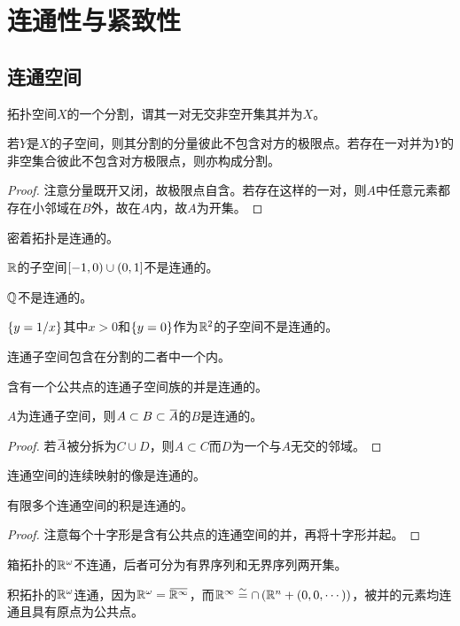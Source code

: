 \documentclass{ctexrep}
\begin{document}
  \section{连通性与紧致性}
  \subsection{连通空间}
  \begin{definition}
    拓扑空间$X$的一个分割，谓其一对无交非空开集其并为$X$。
  \end{definition}
  \begin{lemma}
    若$Y$是$X$的子空间，则其分割的分量彼此不包含对方的极限点。若存在一对并为$Y$的非空集合彼此不包含对方极限点，则亦构成分割。
  \end{lemma}
  \begin{proof}
    注意分量既开又闭，故极限点自含。若存在这样的一对，则$A$中任意元素都存在小邻域在$B$外，故在$A$内，故$A$为开集。
  \end{proof}
  \begin{ex}
    密着拓扑是连通的。
  \end{ex}
  \begin{ex}
    $\mathbb{R}$的子空间$\left[-1,0\right)\cup\left(0,1\right]$不是连通的。
  \end{ex}
  \begin{ex}
    $\mathbb{Q}$不是连通的。
  \end{ex}
  \begin{ex}
    $\left\{y=1/x\right\}$其中$x>0$和$\left\{y=0\right\}$作为$\mathbb{R}^2$的子空间不是连通的。
  \end{ex}
  \begin{lemma}
    连通子空间包含在分割的二者中一个内。
  \end{lemma}
  \begin{theorem}
    含有一个公共点的连通子空间族的并是连通的。
  \end{theorem}
  \begin{theorem}
    $A$为连通子空间，则$A\subset B \subset \clo{A}$的$B$是连通的。
  \end{theorem}
  \begin{proof}
    若$\clo{A}$被分拆为$C\cup D$，则$A\subset C$而$D$为一个与$A$无交的邻域。
  \end{proof}
  \begin{theorem}
    连通空间的连续映射的像是连通的。
  \end{theorem}
  \begin{theorem}
    有限多个连通空间的积是连通的。
  \end{theorem}
  \begin{proof}
    注意每个十字形是含有公共点的连通空间的并，再将十字形并起。
  \end{proof}
  \begin{ex}
    箱拓扑的$\mathbb{R}^\omega$不连通，后者可分为有界序列和无界序列两开集。
  \end{ex}
  \begin{ex}
    积拓扑的$\mathbb{R}^\omega$连通，因为$\R^\omega=\clo{\R^\infty}$，而$\mathbb{R}^\infty\overset{\sim}{=}\cap\left(\mathbb{R}^n+\left(0,0,\cdots\right)\right)$，被并的元素均连通且具有原点为公共点。
  \end{ex}
\end{document}
